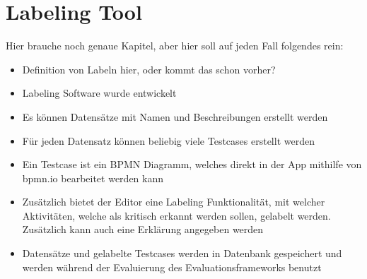 \section{Labeling Tool}\label{sec:labeling-tool}

Hier brauche noch genaue Kapitel, aber hier soll auf jeden Fall folgendes rein:
\begin{itemize}
    \item Definition von Labeln hier, oder kommt das schon vorher?
    \item Labeling Software wurde entwickelt
    \item Es können Datensätze mit Namen und Beschreibungen erstellt werden
    \item Für jeden Datensatz können beliebig viele Testcases erstellt werden
    \item Ein Testcase ist ein BPMN Diagramm, welches direkt in der App mithilfe von bpmn.io bearbeitet werden kann
    \item Zusätzlich bietet der Editor eine Labeling Funktionalität, mit welcher Aktivitäten, welche als kritisch erkannt werden sollen, gelabelt werden. Zusätzlich kann auch eine Erklärung angegeben werden
    \item Datensätze und gelabelte Testcases werden in Datenbank gespeichert und werden während der Evaluierung des Evaluationsframeworks benutzt
\end{itemize}